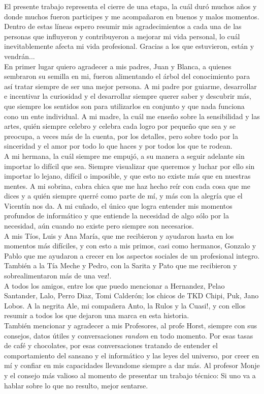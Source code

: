 El presente trabajo representa el cierre de una etapa, la cu\'al dur\'o muchos a\~nos y donde muchos fueron participes y me acompa\~naron en buenos y malos momentos.  Dentro de estas l\'ineas espero resumir mis agradecimientos a cada una de las personas que influyeron y contribuyeron a mejorar mi vida personal, lo cu\'al inevitablemente afecta mi vida profesional. Gracias a los que estuvieron, est\'an y vendr\'an...
\\

En primer lugar quiero agradecer a mis padres, Juan y Blanca, a quienes sembraron su semilla en mi, fueron alimentando el \'arbol del conocimiento para as\'i tratar siempre de ser una mejor persona. A mi padre por guiarme, desarrollar e incentivar la curiosidad y el desarrollar siempre querer saber y descubrir m\'as, que siempre los sentidos son para utilizarlos en conjunto y que nada funciona cono un ente individual. A mi madre, la cu\'al me ense\~no sobre la sensibilidad y las artes, qui\'en siempre celebro y celebra cada logro por peque\~no que sea y se preocupa, a veces m\'as de la cuenta, por los detalles, pero sobre todo por la sinceridad y el amor por todo lo que haces y por todos los que te rodean. 
\\

A mi hermana, la cu\'al siempre me empuj\'o, a su manera a seguir adelante sin importar lo dif\'icil que sea. Siempre visualizar que queremos y luchar por ello sin importar lo lejano, dif\'icil o imposible, y que esto no existe m\'as que en nuestras mentes. A mi sobrina, cabra chica que me haz hecho re\'ir con cada cosa que me dices y a qui\'en siempre querr\'e como parte de m\'i, y m\'as con la alegr\'ia que el Vicent\'in nos da. A mi cu\~nado, el \'unico que logra entender mis momentos profundos de inform\'atico y que entiende la necesidad de algo s\'olo por la necesidad, a\'un cuando no existe pero siempre son necesarios.
\\

A mis T\'ios, Luis y Ana Mar\'ia, que me recibieron y ayudaron hasta en los momentos m\'as dif\'iciles, y con esto a mis primos, casi como hermanos, Gonzalo y Pablo que me ayudaron a crecer en los aspectos sociales de un profesional integro. Tambi\'en a la T\'ia Meche y Pedro, con la Sarita y Pato que me recibieron y sobrealimentaron m\'as de una vez!.
\\

A todos los amigos, entre los que puedo mencionar a Hernandez, Pelao Santander, Lalo, Perro Diaz, Tomi Calder\'on; los chicos de TKD Chipi, Puk, Jano Lobos. A la negrita Ale, mi compa\~nera Anto, la Rulos y la Cuasi!,  y con ellos resumir a todos los que dejaron una marca en esta historia.
\\

Tambi\'en mencionar y agradecer a mis Profesores, al profe Horst, siempre con sus consejos, datos \'utiles y conversaciones \textit{random} en todo momento. Por esas tasas de caf\'e y chocolates, por esas conversaciones tratando de entender el comportamiento del sansano y el inform\'atico y las leyes del universo, por creer en m\'i y confiar en mis capacidades llevandome siempre a dar m\'as. Al profesor Monje y el consejo m\'as valioso al momento de presentar un trabajo t\'ecnico: Si uno va a hablar sobre lo que no resulto, mejor sentarse.
